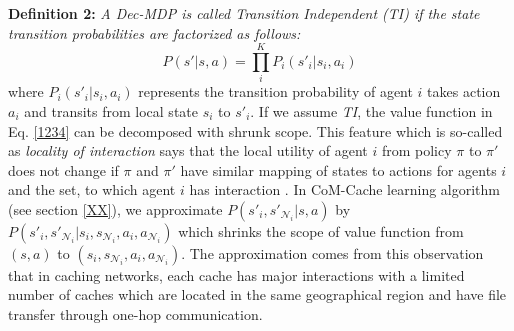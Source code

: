 \documentclass[journal,onecolumn]{IEEEtran}
\begin{document}
\textbf{Definition 2:} \textit{A Dec-MDP is called Transition Independent (TI) if the state transition probabilities are factorized as follows:}
\begin{equation}
P(s'|s,a) = \prod_i^{K} P_i(s'_i|s_i,a_i)
\end{equation}
where $P_i(s'_i|s_i,a_i)$ represents the transition probability of agent $i$ takes action $a_i$ and transits from local state $s_i$ to $s'_i$. If we assume \textit{TI}, the value function in  Eq. \ref{1234} can be decomposed with shrunk scope. This feature which is so-called as \textit{locality of interaction} says that the local utility of agent $i$ from policy $\pi$ to $\pi'$ does not change if $\pi$ and $\pi'$ have similar mapping of states to actions for agents $i$ and the set, to which agent $i$ has interaction \cite{nair2005networked}. 
In CoM-Cache learning algorithm (see section \ref{XX}), we approximate $P(s'_i,s'_{\mathcal{N}_i}|s,a)$ by $P(s'_i,s'_{\mathcal{N}_i}|s_i,s_{\mathcal{N}_i},a_i,a_{\mathcal{N}_i})$ which shrinks the scope of value function from $(s,a)$ to $(s_i,s_{\mathcal{N}_i},a_i,a_{\mathcal{N}_i})$. The approximation comes from this observation that in caching networks, each cache has major interactions with a limited number of caches which are located in the same geographical region and have file transfer through one-hop communication.

%




\end{document}
